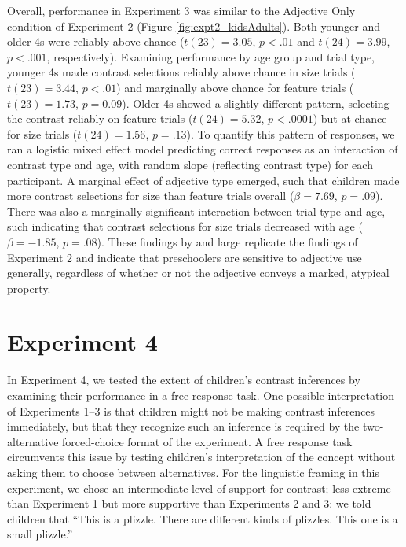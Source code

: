 \documentclass[man]{apa2}
\begin{document}
Overall, performance in Experiment 3 was similar to the Adjective Only condition of Experiment 2 (Figure \ref{fig:expt2_kidsAdults}). 
Both younger and older 4s were reliably above chance ($t(23) = 3.05$, $p<.01$ and $t(24) = 3.99$, $p<.001$, respectively). Examining performance by age group and trial type, younger 4s made contrast selections reliably above chance in size trials ($t(23)=3.44$, $p<.01$) and marginally above chance for feature trials ($t(23)=1.73$, $p=0.09$). Older 4s showed a slightly different pattern, selecting the contrast reliably on feature trials ($t(24)=5.32$, $p<.0001$) but at chance for size trials ($t(24)=1.56$, $p=.13$). To quantify this pattern of responses, we ran a logistic mixed effect model predicting correct responses as an interaction of contrast type and age, with random slope (reflecting contrast type) for each participant.  A marginal effect of adjective type emerged, such that children made more contrast selections for size than feature trials overall ($\beta = 7.69$, $p = .09$). There was also a marginally significant interaction between trial type and age, such indicating that contrast selections for size trials decreased with age ($\beta = -1.85$, $p = .08$). These findings by and large replicate the findings of Experiment 2 and indicate that preschoolers are sensitive to adjective use generally, regardless of whether or not the adjective conveys a marked, atypical property.

\section{Experiment 4} 

In Experiment 4, we tested the extent of children's contrast inferences by examining their performance in a free-response task. One possible interpretation of Experiments 1--3 is that children might not be making  contrast inferences immediately, but that they recognize such an inference is required by the two-alternative forced-choice format of the experiment. A free response task circumvents this issue by testing children's interpretation of the concept without asking them to choose between alternatives. For the linguistic framing in this experiment, we chose an intermediate level of support for contrast; less extreme than Experiment 1 but more supportive than Experiments 2 and 3: we told children that ``This is a plizzle. There are different kinds of plizzles. This one is a small plizzle.'' 
\end{document}
